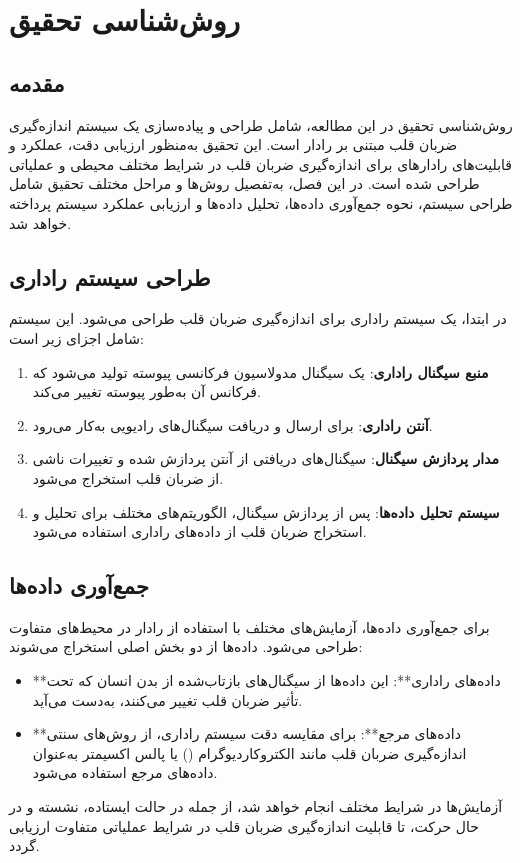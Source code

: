 \section{روش‌شناسی تحقیق} %
\label{sec:methodology}

\subsection{مقدمه} %
\label{sec:methodology-intro}
روش‌شناسی تحقیق در این مطالعه، شامل طراحی و پیاده‌سازی یک سیستم اندازه‌گیری ضربان قلب مبتنی بر رادار  است. این تحقیق به‌منظور ارزیابی دقت، عملکرد و قابلیت‌های رادارهای  برای اندازه‌گیری ضربان قلب در شرایط مختلف محیطی و عملیاتی طراحی شده است. در این فصل، به‌تفصیل روش‌ها و مراحل مختلف تحقیق شامل طراحی سیستم، نحوه جمع‌آوری داده‌ها، تحلیل داده‌ها و ارزیابی عملکرد سیستم پرداخته خواهد شد.

\subsection{طراحی سیستم راداری } %
\label{sec:fmcw-system-design}
در ابتدا، یک سیستم راداری  برای اندازه‌گیری ضربان قلب طراحی می‌شود. این سیستم شامل اجزای زیر است:
\begin{enumerate}
    \item \textbf{منبع سیگنال راداری}: یک سیگنال مدولاسیون فرکانسی پیوسته تولید می‌شود که فرکانس آن به‌طور پیوسته تغییر می‌کند.
    \item \textbf{آنتن راداری}: برای ارسال و دریافت سیگنال‌های رادیویی به‌کار می‌رود.
    \item \textbf{مدار پردازش سیگنال}: سیگنال‌های دریافتی از آنتن پردازش شده و تغییرات ناشی از ضربان قلب استخراج می‌شود.
    \item \textbf{سیستم تحلیل داده‌ها}: پس از پردازش سیگنال، الگوریتم‌های مختلف برای تحلیل و استخراج ضربان قلب از داده‌های راداری استفاده می‌شود.
\end{enumerate}

\subsection{جمع‌آوری داده‌ها} %
\label{sec:data-collection}
برای جمع‌آوری داده‌ها، آزمایش‌های مختلف با استفاده از رادار  در محیط‌های متفاوت طراحی می‌شود. داده‌ها از دو بخش اصلی استخراج می‌شوند:
\begin{itemize}
    \item **داده‌های راداری**: این داده‌ها از سیگنال‌های بازتاب‌شده از بدن انسان که تحت تأثیر ضربان قلب تغییر می‌کنند، به‌دست می‌آید.
    \item **داده‌های مرجع**: برای مقایسه دقت سیستم راداری، از روش‌های سنتی اندازه‌گیری ضربان قلب مانند الکتروکاردیوگرام () یا پالس اکسیمتر به‌عنوان داده‌های مرجع استفاده می‌شود.
\end{itemize}
آزمایش‌ها در شرایط مختلف انجام خواهد شد، از جمله در حالت ایستاده، نشسته و در حال حرکت، تا قابلیت اندازه‌گیری ضربان قلب در شرایط عملیاتی متفاوت ارزیابی گردد.

